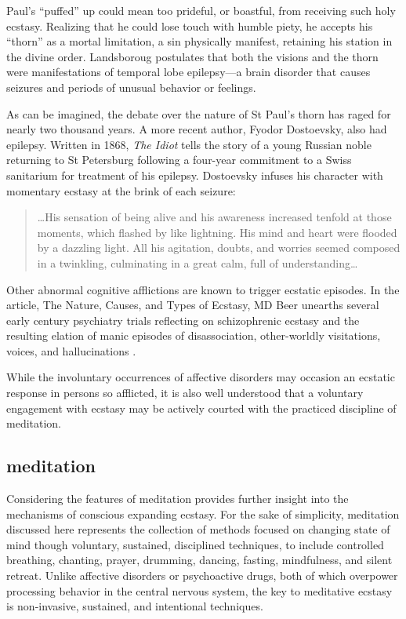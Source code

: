 \documentclass{UIdahoMastersThesis}
\begin{document}
Paul's ``puffed'' up could mean too prideful, or boastful, from receiving such holy ecstasy. Realizing that he could lose touch with humble piety, he accepts his ``thorn'' as a mortal limitation, a sin physically manifest, retaining his station in the divine order. Landsboroug postulates that both the visions and the thorn were manifestations of temporal lobe epilepsy---a brain disorder that causes seizures and periods of unusual behavior or feelings.

As can be imagined, the debate over the nature of St Paul's thorn has raged for nearly two thousand years. A more recent author, Fyodor Dostoevsky, also had epilepsy. Written in 1868, \emph{The Idiot} tells the story of a young Russian noble returning to St Petersburg following a four-year commitment to a Swiss sanitarium for treatment of his epilepsy. Dostoevsky infuses his character with momentary ecstasy at the brink of each seizure:

\begin{quote}
{\ldots His sensation of being alive and his awareness increased tenfold at those moments, which flashed by like lightning. His mind and heart were flooded by a dazzling light. All his agitation, doubts, and worries seemed composed in a twinkling, culminating in a great calm, full of understanding\ldots}\cite{bible_new_1984}
\end{quote}

Other abnormal cognitive afflictions are known to trigger ecstatic episodes. In the article, The Nature, Causes, and Types of Ecstasy, MD Beer unearths several early  century psychiatry trials reflecting on schizophrenic ecstasy and the resulting elation of manic episodes of disassociation, other-worldly visitations, voices, and hallucinations \cite{beer_nature_2000}.

While the involuntary occurrences of affective disorders may occasion an ecstatic response in persons so afflicted, it is also well understood that a voluntary engagement with ecstasy may be actively courted with the practiced discipline of meditation.

\subsection{meditation}
Considering the features of meditation provides further insight into the mechanisms of conscious expanding ecstasy. For the sake of simplicity, meditation discussed here represents the collection of methods focused on changing state of mind though voluntary, sustained, disciplined techniques, to include controlled breathing, chanting, prayer, drumming, dancing, fasting, mindfulness, and silent retreat. Unlike affective disorders or psychoactive drugs, both of which overpower processing behavior in the central nervous system, the key to meditative ecstasy is non-invasive, sustained, and intentional techniques.
\end{document}
